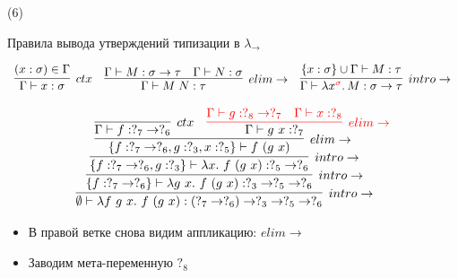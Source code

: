     \begin{frame}[t, noframenumbering]{\btypename (6)}
        \begin{block}{Правила вывода утверждений типизации в $\lambda_{\rightarrow}$}
            \vspace{-1em}
            \begin{center}
                \[
                    \begin{array}{l c r}
                        \infer[ctx]{\Gamma \vdash x: \sigma}{(x: \sigma) \in \Gamma}
                        &
                        \infer[elim\to]{\Gamma \vdash M\;N : \tau}{\Gamma \vdash M : \sigma \to \tau & \Gamma \vdash N : \sigma}
                        &
                        \infer[intro\to]{\Gamma \vdash \lambda x^{\color{red} \sigma}\ldotp M : \sigma \to \tau}{\{x : \sigma\} \cup \Gamma \vdash M : \tau}
                    \end{array}
                \]
            \end{center}
        \end{block}
        \[
            \infer[intro\to]{\emptyset \vdash \lambda f~g~x.~f~(g~x) : (?_7 \to ?_6) \to ?_3 \to ?_5 \to ?_6}{
                \infer[intro\to]{\{f: ?_7 \to ?_6\} \vdash \lambda g~x.~f~(g~x) : ?_3 \to ?_5 \to ?_6}{
                    \infer[intro\to]{\{f: ?_7 \to ?_6, g: ?_3\} \vdash \lambda x.~f~(g~x) : ?_5 \to ?_6 }{
                        \infer[elim\to]{\{f: ?_7 \to ?_6, g: ?_3, x: ?_5\} \vdash f~(g~x) }{
                            \infer[ctx]{\Gamma \vdash f : ?_7 \to ?_6}{} &
                            \color{red}\infer[elim\to]{\color{black}\Gamma \vdash g~x : ?_7}{
                                \Gamma \vdash g : ?_8 \to ?_7 &
                                \Gamma \vdash x : ?_8
                            }}}}}
        \]
        \vspace{-1em}
        \begin{itemize}
            \item В правой ветке снова видим аппликацию: $elim\to$
            \item Заводим мета-переменную $?_8$
        \end{itemize}
    \end{frame}

